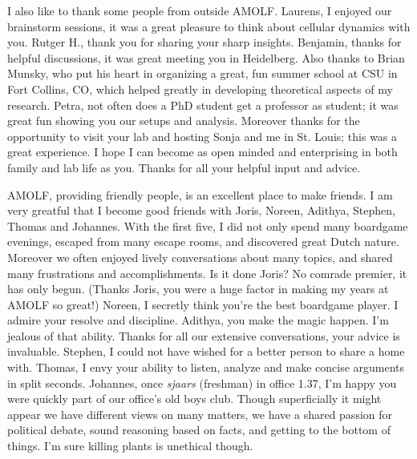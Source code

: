 

I also like to thank some people from outside AMOLF. 
Laurens, I enjoyed our brainstorm sessions, 
it was a great pleasure to think about cellular dynamics with you.
%
Rutger H., thank you for sharing your sharp insights.
%
Benjamin, thanks for helpful discussions, 
it was great meeting you in Heidelberg.
%
Also thanks to Brian Munsky,
who put his heart in organizing a great, fun summer school at CSU in Fort Collins, CO,
which helped greatly in developing theoretical aspects of my research.
%
Petra,
not often does a PhD student get a professor as student; 
it was great fun showing you our setups and analysis. 
Moreover thanks for the opportunity to visit your lab and hosting Sonja and me
in St. Louis; this was a great experience.
I hope I can become as open minded and enterprising in both family and lab life as you. 
Thanks for all your helpful input and advice. 
%





AMOLF, providing friendly people, is an excellent place to make friends.
%
I am very greatful that I become good friends with 
Joris, Noreen, Adithya, Stephen, Thomas and Johannes.
%
With the first five, I did not only spend many boardgame evenings, 
escaped from many escape rooms, 
and discovered great Dutch nature.
%
Moreover we often enjoyed lively conversations about many topics, 
and shared many frustrations and accomplishments.
%
Is it done Joris? No comrade premier, it has only begun. 
(Thanks Joris, you were a huge factor in making my years at AMOLF so great!) 
%
Noreen, I secretly think you're the best boardgame player.
I admire your resolve and discipline. 
%
Adithya, you make the magic happen. I'm jealous of that ability.
Thanks for all our extensive conversations, your advice is invaluable. 
%
Stephen, I could not have wished for a better person to share a home with.
%
Thomas, I envy your ability to listen, analyze and make concise arguments in split seconds.
%
Johannes, once \textit{sjaars} (freshman) in office 1.37, I'm happy you were quickly part of our office's old boys club.
Though superficially it might appear we have different views on many matters, 
we have a shared passion for political debate, sound reasoning based on facts, and getting to the bottom of things.
%
I'm sure killing plants is unethical though.

